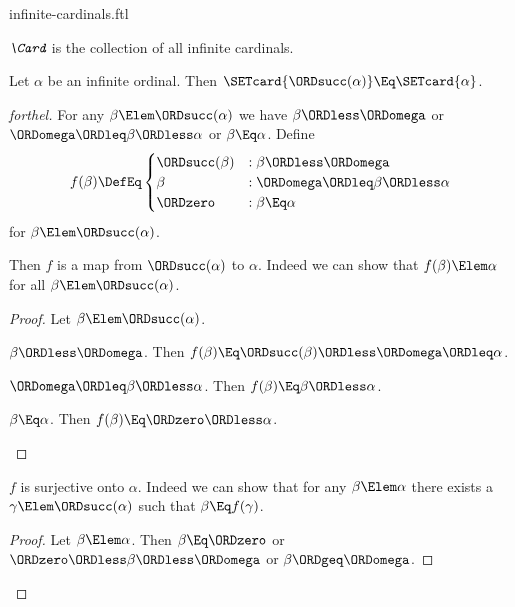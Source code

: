 \documentclass{stex}
\begin{document}
\begin{smodule}{infinite-cardinals.ftl}

\begin{definition}[forthel,for=Card]
  $\emph{\Card}$ is the collection of all infinite cardinals.
\end{definition}

\begin{proposition}[forthel]
  Let $\alpha$ be an infinite ordinal.
  Then $\SETcard{\ORDsucc(\alpha)} \Eq \SETcard{\alpha}$.
\end{proposition}
\begin{proof}[forthel]
  For any $\beta \Elem \ORDsucc(\alpha)$ we have
  $\beta \ORDless \ORDomega$ or $\ORDomega \ORDleq \beta \ORDless \alpha$ or $\beta \Eq \alpha$.
  Define \[ f(\beta) \DefEq
    \begin{cases}
      \ORDsucc(\beta)  & : \beta \ORDless \ORDomega
      \\
      \beta         & : \ORDomega \ORDleq \beta \ORDless \alpha
      \\
      \ORDzero             & : \beta \Eq \alpha
    \end{cases} \]
  for $\beta \Elem \ORDsucc(\alpha)$.

  Then $f$ is a map from $\ORDsucc(\alpha)$ to $\alpha$.
  Indeed we can show that $f(\beta) \Elem \alpha$ for all
  $\beta \Elem \ORDsucc(\alpha)$.
  \begin{proof}
    Let $\beta \Elem \ORDsucc(\alpha)$.

    \begin{case}{$\beta \ORDless \ORDomega$.}
      Then $f(\beta)
        \Eq \ORDsucc(\beta)
        \ORDless \ORDomega
        \ORDleq \alpha$.
    \end{case}

    \begin{case}{$\ORDomega \ORDleq \beta \ORDless \alpha$.}
      Then $f(\beta)
        \Eq \beta
        \ORDless \alpha$.
    \end{case}

    \begin{case}{$\beta \Eq \alpha$.}
      Then $f(\beta)
        \Eq \ORDzero
        \ORDless \alpha$.
    \end{case}
  \end{proof}

  $f$ is surjective onto $\alpha$.
  Indeed we can show that for any $\beta \Elem \alpha$ there exists a
  $\gamma \Elem \ORDsucc(\alpha)$ such that $\beta \Eq f(\gamma)$.
  \begin{proof}
    Let $\beta \Elem \alpha$.
    Then $\beta \Eq \ORDzero$ or $\ORDzero \ORDless \beta \ORDless \ORDomega$ or $\beta \ORDgeq \ORDomega$.


\end{proof}
\end{proof}
\end{smodule}
\end{document}
